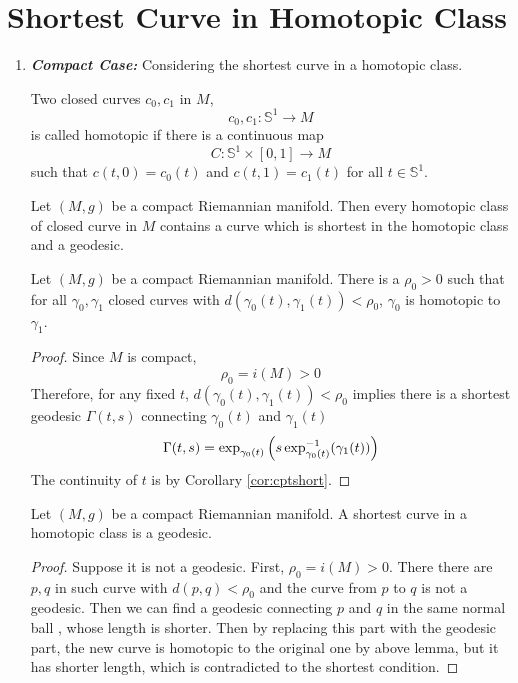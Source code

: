 \section{Shortest Curve in Homotopic Class}

\begin{enumerate}[label=\arabic{*}.]
	\item {\emph{\textbf{Compact Case:}}} Considering the shortest curve in a homotopic class.
	\begin{defn}
		Two closed curves $c_0,c_1$ in $M$,
		\begin{equation*}
			c_0,c_1 \colon \mathbb{S}^1 \longrightarrow M
		\end{equation*}
		is called homotopic if there is a continuous map
		\begin{equation*}
			C \colon \mathbb{S}^1 \times [0,1] \longrightarrow M
		\end{equation*}
		such that $c(t,0) = c_0(t)$ and $c(t,1) = c_1(t)$ for all $t \in \mathbb{S}^1$.
	\end{defn}

	\begin{thm}\label{thm:homocpt}
		Let $(M,g)$ be a compact Riemannian manifold. Then every homotopic class of closed curve in $M$ contains a curve which is shortest in the homotopic class and a geodesic.
	\end{thm}

	\begin{lem}
		Let $(M,g)$ be a compact Riemannian manifold. There is a $\rho_0 > 0$ such that for all $\gamma_0,\gamma_1$ closed curves with $d(\gamma_0(t),\gamma_1(t)) < \rho_0$, $\gamma_0$ is homotopic to $\gamma_1$.
	\end{lem}
	\begin{proof}
		Since $M$ is compact,
		\begin{equation*}
			\rho_0 = i(M) > 0
		\end{equation*}
		Therefore, for any fixed $t$, $d(\gamma_0(t),\gamma_1(t)) < \rho_0$ implies there is a shortest geodesic $\Gamma(t,s)$ connecting $\gamma_0(t)$ and $\gamma_1(t)$
		\begin{equation*}
			\Gamma(t,s) = \exp_{\gamma_0(t)}\left(s\exp_{\gamma_0(t)}^{-1}(\gamma_1(t))\right)
		\end{equation*}
		The continuity of $t$ is by Corollary \ref{cor:cptshort}.
	\end{proof}
	\begin{cor}
		Let $(M,g)$ be a compact Riemannian manifold. A shortest curve in a homotopic class is a geodesic.
	\end{cor}
	\begin{proof}
		Suppose it is not a geodesic. First, $\rho_0 = i(M) > 0$. There there are $p,q$ in such curve with $d(p,q) < \rho_0$ and the curve from $p$ to $q$ is not a geodesic. Then we can find a geodesic connecting $p$ and $q$ in the same normal ball , whose length is shorter. Then by replacing this part with the geodesic part, the new curve is homotopic to the original one by above lemma, but it has shorter length, which is contradicted to the shortest condition.
	\end{proof}


\end{enumerate}
